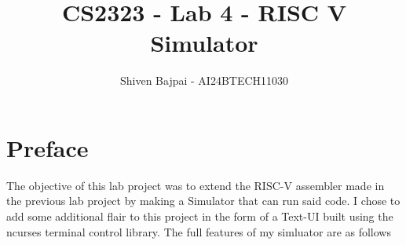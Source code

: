 \documentclass[12pt]{article}
\begin{document}
	
	\vspace{3cm}

	\title{CS2323 - Lab 4 - RISC V Simulator}
	\author{Shiven Bajpai - AI24BTECH11030}

	\maketitle
	\bigskip    	

	\renewcommand{\thefigure}{\theenumi}
	\renewcommand{\thetable}{\theenumi}

	\tableofcontents
	\newpage

	\section{Preface}
	
	The objective of this lab project was to extend the RISC-V assembler made in the previous lab project by making a Simulator that can run said code. I chose to add some additional flair to this project in the form of a Text-UI built using the ncurses terminal control library. The full features of my simluator are as follows
\end{document}
